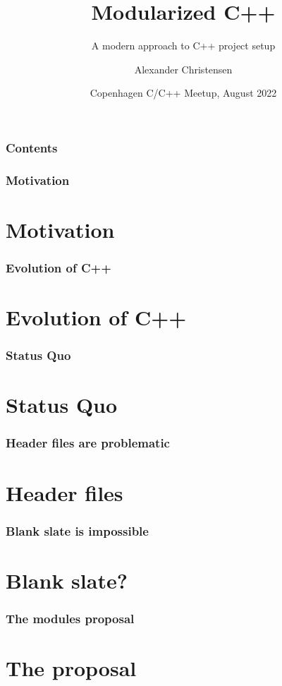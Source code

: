 \documentclass{beamer}
\title{Modularized C++}
\subtitle{A modern approach to C++ project setup}
\author{Alexander Christensen}
\institute{}
\date[VLC]
{Copenhagen C/C++ Meetup, August 2022}
\begin{document}
%
%
\begin{frame}
    \titlepage
\end{frame}


%
%
\begin{frame}
\frametitle{Contents}
\tableofcontents
\end{frame}


%
%
\begin{frame}
\frametitle{Motivation}
\section{Motivation}
\end{frame}


%
%
\begin{frame}
\frametitle{Evolution of C++}
\section{Evolution of C++}
\end{frame}


%
%
\begin{frame}
\frametitle{Status Quo}
\section{Status Quo}
\end{frame}


%
%
\begin{frame}
\frametitle{Header files are problematic}
\section{Header files}
\end{frame}


%
%
\begin{frame}
\frametitle{Blank slate is impossible}
\section{Blank slate?}
\end{frame}


%
%
\begin{frame}
\frametitle{The modules proposal}
\section{The proposal}
\end{frame}
\end{document}
